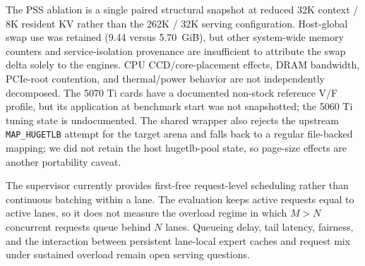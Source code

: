 The PSS ablation is a single paired structural snapshot at reduced 32K context / 8K resident KV rather than the 262K / 32K serving configuration. Host-global swap use was retained (9.44 versus 5.70~GiB), but other system-wide memory counters and service-isolation provenance are insufficient to attribute the swap delta solely to the engines. CPU CCD/core-placement effects, DRAM bandwidth, PCIe-root contention, and thermal/power behavior are not independently decomposed. The 5070 Ti cards have a documented non-stock reference V/F profile, but its application at benchmark start was not snapshotted; the 5060 Ti tuning state is undocumented. The shared wrapper also rejects the upstream \texttt{MAP\_HUGETLB} attempt for the target arena and falls back to a regular file-backed mapping; we did not retain the host hugetlb-pool state, so page-size effects are another portability caveat.

The supervisor currently provides first-free request-level scheduling rather than continuous batching within a lane. The evaluation keeps active requests equal to active lanes, so it does not measure the overload regime in which $M>N$ concurrent requests queue behind $N$ lanes. Queueing delay, tail latency, fairness, and the interaction between persistent lane-local expert caches and request mix under sustained overload remain open serving questions.

